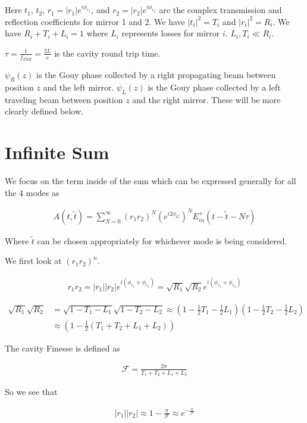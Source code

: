 \documentclass[12pt]{article}
\begin{document}
Here $t_1$, $t_2$, $r_1 = |r_1|e^{i\phi_{r_1}}$, and $r_2 = |r_2|e^{i\phi_{r_2}}$ are the complex transmission and reflection coefficients for mirror 1 and 2. We have $|t_i|^2 = T_i$ and $|r_i|^2 = R_i$. We have $R_i+T_i+L_i = 1$ where $L_i$ represents losses for mirror $i$. $L_i,T_i \ll R_i$. 

$\tau = \frac{1}{f_{FSR}} = \frac{2L}{c}$ is the cavity round trip time. 

$\psi_R(z)$ is the Gouy phase collected by a right propagating beam between position $z$ and the left mirror. $\psi_L(z)$ is the Gouy phase collected by a left traveling beam between position $z$ and the right mirror. These will be more clearly defined below.

\section{Infinite Sum}

We focus on the term inside of the sum which can be expressed generally for all the 4 modes as

\begin{align}
A(t,\tilde{t}) = \sum_{N=0}^{\infty}(r_1r_2)^N \left(e^{i2 \phi_G} \right)^N E_{in}^+(t-\tilde{t} - N\tau)
\end{align}

Where $\tilde{t}$ can be chosen appropriately for whichever mode is being considered.

We first look at $(r_1r_2)^n$.

\begin{align}
r_1 r_2 = |r_1||r_2|e^{i(\phi_{r_1} + \phi_{r_2})} = \sqrt{R_1}\sqrt{R_2} e^{i(\phi_{r_1}+\phi_{r_2})}
\end{align}

\begin{align}
\sqrt{R_1}\sqrt{R_2} &= \sqrt{1-T_1-L_1}\sqrt{1-T_2-L_2} \approx \left(1-\frac{1}{2}T_1 - \frac{1}{2}L_1\right)\left(1-\frac{1}{2}T_2 - \frac{1}{2}L_2\right)\\
&\approx \left(1-\frac{1}{2}\left(T_1+T_2+L_1+L_2\right)\right)
\end{align}

The cavity Finesse is defined as

\begin{align}
\mathcal{F} = \frac{2\pi}{T_1+T_2+L_1+L_2}
\end{align}

So we see that

\begin{align}
|r_1||r_2| \approx 1 - \frac{\pi}{\mathcal{F}} \approx e^{-\frac{\pi}{\mathcal{F}}}
\end{align}
\end{document}
